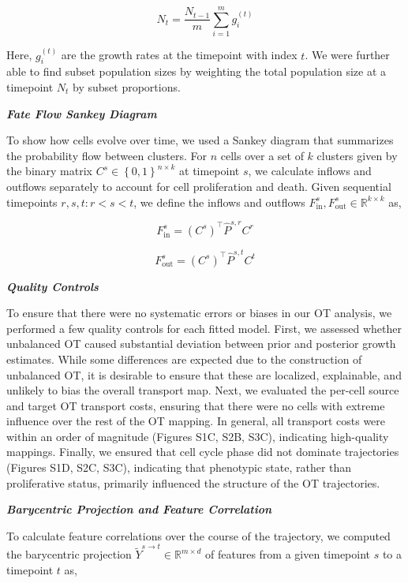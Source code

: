 \[N_{t} = \frac{N_{t - 1}}{m}\sum_{i = 1}^{m}g_{i}^{(t)}\]

Here, \(g_{i}^{(t)}\) are the growth rates at the timepoint with index
\(t\). We were further able to find subset population sizes by weighting
the total population size at a timepoint \(N_{t}\) by subset
proportions.

\emph{\textbf{Fate Flow Sankey Diagram}}

To show how cells evolve over time, we used a Sankey diagram that
summarizes the probability flow between clusters. For \(n\) cells over a
set of \(k\) clusters given by the binary matrix
\(C^{s} \in \left\{ 0,1 \right\}^{n \times k}\) at timepoint \(s\), we
calculate inflows and outflows separately to account for cell
proliferation and death. Given sequential timepoints
\(r,s,t:r < s < t\), we define the inflows and outflows
\(F_{\mathrm{\text{in}}}^{s},F_{\mathrm{\text{out}}}^{s} \in \mathbb{R}^{k \times k}\)
as,

\[F_{\mathrm{\text{in}}}^{s} = \left( C^{s} \right)^{\top}{\widehat{P}}^{s,r}C^{r}\]

\[F_{\mathrm{\text{out}}}^{s} = \left( C^{s} \right)^{\top}{\widehat{P}}^{s,t}C^{t}\]

\emph{\textbf{Quality Controls}}

To ensure that there were no systematic errors or biases in our OT
analysis, we performed a few quality controls for each fitted model.
First, we assessed whether unbalanced OT caused substantial deviation
between prior and posterior growth estimates. While some differences are
expected due to the construction of unbalanced OT, it is desirable to
ensure that these are localized, explainable, and unlikely to bias the
overall transport map. Next, we evaluated the per-cell source and target
OT transport costs, ensuring that there were no cells with extreme
influence over the rest of the OT mapping. In general, all transport
costs were within an order of magnitude (Figures S1C, S2B, S3C),
indicating high-quality mappings. Finally, we ensured that cell cycle
phase did not dominate trajectories (Figures S1D, S2C, S3C), indicating
that phenotypic state, rather than proliferative status, primarily
influenced the structure of the OT trajectories.

\emph{\textbf{Barycentric Projection and Feature Correlation}}

To calculate feature correlations over the course of the trajectory, we
computed the barycentric projection
\({\widetilde{Y}}^{s \rightarrow t} \in \mathbb{R}^{m \times d}\) of
features from a given timepoint \(s\) to a timepoint \(t\) as,

